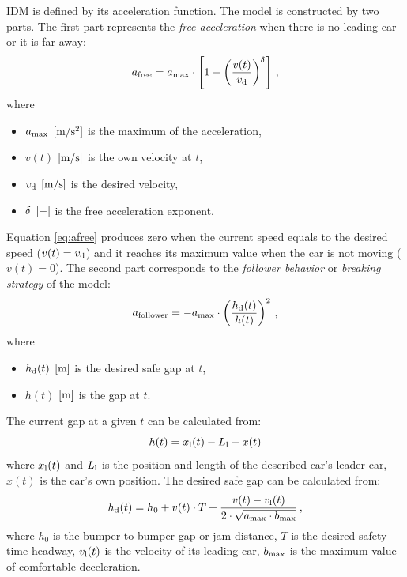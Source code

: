 \documentclass[a4paper,12pt,twoside]{report} %
\begin{document}
			IDM is defined by its acceleration function. The model is constructed by two parts. The first part represents the \textit{free acceleration} when there is no leading car or it is far away:
			\begin{equation}
				a_{\rm free}=a_{\rm max}\cdot \left [ 1 - \left ( \frac{v(t)}{v_{\rm d}} \right )^{\rm \delta} \right ]\,,
				\label{eq:afree}
			\end{equation}
			where
			\begin{itemize}
				\item $a_{\rm max}$ $\rm [m/s^2]$ is the maximum of the acceleration,
				\item $v(t)$ $\rm [m/s]$ is the own velocity at $t$,
				\item $v_{\rm d}$ $\rm [m/s]$ is the desired velocity,
				\item $\rm \delta$ $\rm [-]$ is the free acceleration exponent.
			\end{itemize}
			Equation \ref{eq:afree} produces zero when the current speed equals to the desired speed ($v(t)=v_{\rm d}$) and it reaches its maximum value when the car is not moving ($v(t)=0$).
			The second part corresponds to the \textit{follower behavior} or \textit{breaking strategy} of the model:
			\begin{equation}
				a_{\rm follower}=-a_{\rm max}\cdot \left ( \frac{h_{\rm d}(t)}{h(t)} \right )^2\,,
				\label{eq:afollower}
			\end{equation}
			where
			\begin{itemize}
				\item $h_{\rm d}(t)$ $\rm [m]$ is the desired safe gap at $t$,
				\item $h(t)$ $\rm [m]$ is the gap at $t$.
			\end{itemize}
			The current gap at a given $t$ can be calculated from:
			\begin{equation}
				h(t)=x_{\rm l}(t)-L_{\rm l} - x(t)
			\end{equation}
			where $x_{\rm l}(t)$ and $L_{\rm l}$ is the position and length of the described car's leader car, $x(t)$ is the car's own position.
			The desired safe gap can be calculated from:
			\begin{equation}
				h_{\rm d}(t)=h_0 + v(t)\cdot T + \frac{v(t)-v_{\rm l}(t)}{2\cdot \sqrt{a_{\rm max}\cdot b_{\rm max}}}\,,
			\end{equation}
			where $h_0$ is the bumper to bumper gap or jam distance, $T$ is the desired safety time headway, $v_{\rm l}(t)$ is the velocity of its leading car, $b_{\rm max}$ is the maximum value of comfortable deceleration.
\end{document}
